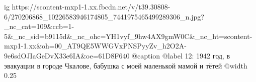  
 
 
 
 

\ifcmt
  ig https://scontent-mxp1-1.xx.fbcdn.net/v/t39.30808-6/270206868_10226583946174805_7441975465499289306_n.jpg?_nc_cat=109&ccb=1-5&_nc_sid=b9115d&_nc_ohc=YH1vyf_9hw4AX9gmW0C&_nc_ht=scontent-mxp1-1.xx&oh=00_AT9QE5WWGVxPNSPyyZv_h2O2A-9e6sdOJIaGeDvX33e6IA&oe=61D8F640
	@caption @label 12: 1942 год, в эвакуации в городе Чкалове, бабушка с моей маленькой мамой и тётей
  @width 0.25
\fi
